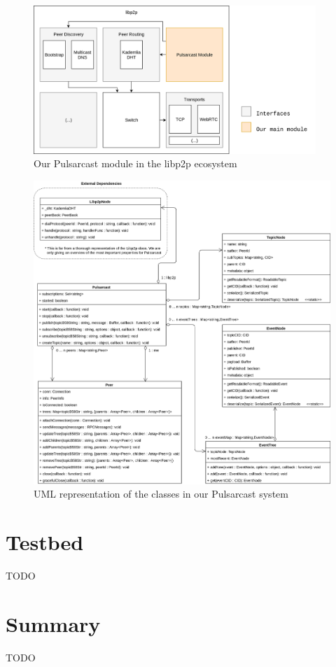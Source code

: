 \begin{figure}[hb!]
  \centering
  \includegraphics[width=0.95\textwidth]{img/pulsarcast-in-libp2p.png}
  \caption{Our Pulsarcast module in the libp2p ecosystem}
  \label{fig:pulsarcast-in-libp2p}
\end{figure}

\begin{figure}[hb!]
  \center
  \includegraphics[width=1\textwidth]{img/uml-pulsarcast.png}
  \caption{UML representation of the classes in our Pulsarcast system}
  \label{fig:pulsarcast-uml}
\end{figure}

\section{Testbed}\label{testbed}

TODO

\section{Summary}\label{summary}

TODO
